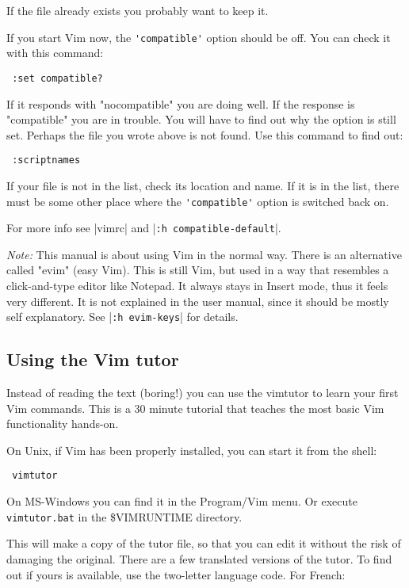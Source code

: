 If the file already exists you probably want to keep it.

If you start Vim now, the \verb!'compatible'! option should be off.
You can check it with this command:

\begin{verbatim}
 :set compatible?
\end{verbatim}

If it responds with "nocompatible" you are doing well.
If the response is "compatible" you are in trouble.
You will have to find out why the option is still set.
Perhaps the file you wrote above is not found.
Use this command to find out:

\begin{verbatim}
 :scriptnames
\end{verbatim}

If your file is not in the list, check its location and name.
If it is in the list, there must be some other place where the \verb!'compatible'! option is switched back on.

For more info see |vimrc| and |\verb!:h compatible-default!|.

\textit{Note:}\newline
This manual is about using Vim in the normal way.
There is an alternative called "evim" (easy Vim).
This is still Vim, but used in a way that resembles a click-and-type editor like Notepad.
It always stays in Insert mode, thus it feels very different.
It is not explained in the user manual, since it should be mostly self explanatory.
See |\verb!:h evim-keys!| for details.

\subsection{Using the Vim tutor}
\label{tutor}
\label{vimtutor}

Instead of reading the text (boring!) you can use the vimtutor to learn your first Vim commands.
This is a 30 minute tutorial that teaches the most basic Vim functionality hands-on.

On Unix, if Vim has been properly installed, you can start it from the shell:

\begin{verbatim}
 vimtutor
\end{verbatim}

On MS-Windows you can find it in the Program/Vim menu.
Or execute \verb!vimtutor.bat! in the \$VIMRUNTIME directory.

This will make a copy of the tutor file, so that you can edit it without the risk of damaging the original.
There are a few translated versions of the tutor.
To find out if yours is available, use the two-letter language code.
For French:

